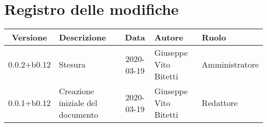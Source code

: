 \section*{Registro delle modifiche}

\begin{center}
	\begin{longtable}{|c|p{3.5cm}|c|p{3cm}|p{3cm}|}
	\hline
	\rowcolor{lighter-grayer}
	\textbf{Versione} & \textbf{Descrizione} & \textbf{Data} & \textbf{Autore} & \textbf{Ruolo} \\
	\hline
	\endfirsthead

	0.0.2+b0.12 & Stesura & 2020-03-19 & Giuseppe Vito Bitetti & Amministratore \\
	\hline
	0.0.1+b0.12 & Creazione iniziale del documento & 2020-03-19 & Giuseppe Vito Bitetti & Redattore \\
	\hline

	\end{longtable}
\end{center}
